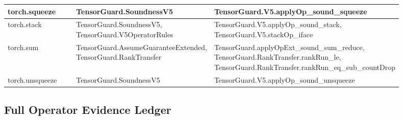 \documentclass[10pt]{article}
\begin{document}
\begin{longtable}{|p{0.20\linewidth}|p{0.23\linewidth}|p{0.47\linewidth}|}
\hline
torch.squeeze & TensorGuard.SoundnessV5 & TensorGuard.V5.applyOp\_sound\_squeeze \\
\hline
torch.stack & TensorGuard.SoundnessV5, TensorGuard.V5OperatorRules & TensorGuard.V5.applyOp\_sound\_stack, TensorGuard.V5.stackOp\_iface \\
\hline
torch.sum & TensorGuard.AssumeGuaranteeExtended, TensorGuard.RankTransfer & TensorGuard.applyOpExt\_sound\_sum\_reduce, TensorGuard.RankTransfer.rankRun\_le, TensorGuard.RankTransfer.rankRun\_eq\_sub\_countDrop \\
\hline
torch.unsqueeze & TensorGuard.SoundnessV5 & TensorGuard.V5.applyOp\_sound\_unsqueeze \\
\hline
\end{longtable}

\subsection{Full Operator Evidence Ledger}
\end{document}
